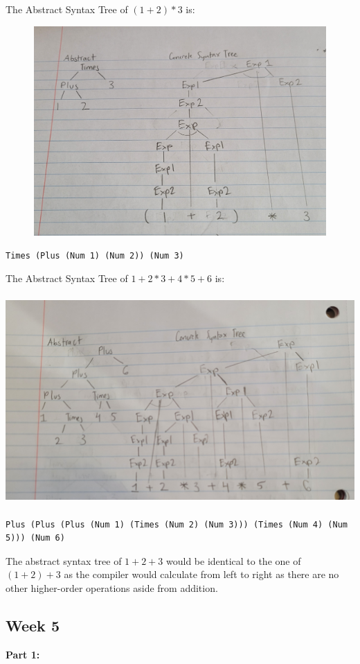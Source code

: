 \documentclass{article}
\theoremstyle{theorem}
\theoremstyle{definition}
\theoremstyle{remark}
\begin{document}
The Abstract Syntax Tree of $(1 + 2) * 3$ is:

\includegraphics[width=15cm, height=8cm]{Report Images/week4_4.jpg}
\begin{lstlisting}
Times (Plus (Num 1) (Num 2)) (Num 3)
\end{lstlisting}

The Abstract Syntax Tree of $1 + 2 * 3 + 4 * 5 + 6$ is:

\includegraphics[width=15cm, height=8cm]{Report Images/week4_5.jpg}
\begin{lstlisting}
Plus (Plus (Plus (Num 1) (Times (Num 2) (Num 3))) (Times (Num 4) (Num 5))) (Num 6)
\end{lstlisting}


The abstract syntax tree of $1+2+3$ would be identical to the one of $(1+2)+3$ as the compiler would calculate from left to right as there are no other higher-order operations aside from addition.

\subsection{Week 5}
\textbf{Part 1:}
\end{document}
